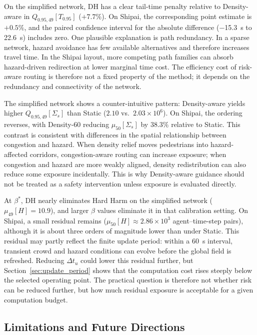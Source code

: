 \documentclass[preprint,12pt]{elsarticle}
\providecommand{\FloatBarrier}{}
\let\origsubsection\subsection
\renewcommand{\subsection}{\FloatBarrier\origsubsection}
\begin{document}
On the simplified network, DH has a clear tail-time penalty relative to
Density-aware in $Q_{0.95,49}[T_{0.95}]$ ($+7.7\%$). On Shipai, the corresponding
point estimate is $+0.5\%$, and the paired confidence interval for the
absolute difference (\SI{-15.3}{s} to \SI{22.6}{s}) includes zero. One
plausible explanation is path redundancy. In a sparse network, hazard avoidance has few
available alternatives and therefore increases travel time. In the
Shipai layout, more competing path families can absorb hazard-driven
redirection at lower marginal time cost. The efficiency cost of
risk-aware routing is therefore not a fixed property of the method; it
depends on the redundancy and connectivity of the network.

The simplified network shows a counter-intuitive pattern:
Density-aware yields higher $Q_{0.95,49}[\Sigma_s]$ than Static
($2.10$ vs.\ $2.03 \times 10^{6}$). On Shipai, the ordering
reverses, with Density-60 reducing $\mu_{50}[\Sigma_s]$ by $38.3\%$ relative to
Static. This contrast is consistent with differences in the spatial
relationship between congestion and hazard. When density relief moves
pedestrians into hazard-affected corridors, congestion-aware routing can
increase exposure; when congestion and hazard are more weakly aligned,
density redistribution can also reduce some exposure incidentally. This
is why Density-aware guidance should not be treated as a safety
intervention unless exposure is evaluated directly.

At $\beta^{*}$, DH nearly eliminates Hard Harm on the simplified network
($\mu_{49}[H]=10.9$), and larger $\beta$ values eliminate it in that
calibration setting. On Shipai, a small residual remains
($\mu_{50}[H] \approx 2.86\times10^3$ agent--time-step pairs), although it is about three orders of magnitude lower
than under Static. This residual may partly reflect the finite update
period: within a \SI{60}{s} interval, transient crowd and hazard
conditions can evolve before the global field is refreshed. Reducing
$\Delta t_u$ could lower this residual further, but
Section~\ref{sec:update_period} shows that the computation cost rises
steeply below the selected operating point. The practical question is
therefore not whether risk can be reduced further, but how much residual
exposure is acceptable for a given computation budget.

\subsection{Limitations and Future Directions}
\label{sec:limitations}
\end{document}
